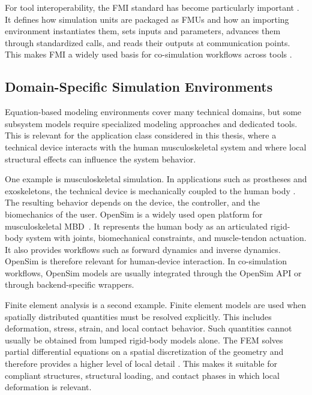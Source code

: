 For tool interoperability, the \ac{FMI} standard has become particularly important \cite{modelica_association_project_fmi_functional_2014}.
It defines how simulation units are packaged as \acp{FMU} and how an importing environment instantiates them, sets inputs and parameters, advances them through standardized calls, and reads their outputs at communication points.
This makes \ac{FMI} a widely used basis for co-simulation workflows across tools \cite{gomes_co-simulation_2019}.

\subsection{Domain-Specific Simulation Environments}

Equation-based modeling environments cover many technical domains, but some subsystem models require specialized modeling approaches and dedicated tools.
This is relevant for the application class considered in this thesis, where a technical device interacts with the human musculoskeletal system and where local structural effects can influence the system behavior.

One example is musculoskeletal simulation.
In applications such as prostheses and exoskeletons, the technical device is mechanically coupled to the human body \cite{eberle_biomechanical_2025}.
The resulting behavior depends on the device, the controller, and the biomechanics of the user.
OpenSim is a widely used open platform for musculoskeletal \ac{MBD}~\cite{OpenSim_Delp,seth_opensim_2018}.
It represents the human body as an articulated rigid-body system with joints, biomechanical constraints, and muscle-tendon actuation.
It also provides workflows such as forward dynamics and inverse dynamics.
OpenSim is therefore relevant for human-device interaction.
In co-simulation workflows, OpenSim models are usually integrated through the OpenSim \ac{API} or through backend-specific wrappers.

Finite element analysis is a second example.
Finite element models are used when spatially distributed quantities must be resolved explicitly.
This includes deformation, stress, strain, and local contact behavior.
Such quantities cannot usually be obtained from lumped rigid-body models alone.
The \ac{FEM} solves partial differential equations on a spatial discretization of the geometry and therefore provides a higher level of local detail \cite{knothe_finite_2017}.
This makes it suitable for compliant structures, structural loading, and contact phases in which local deformation is relevant.

